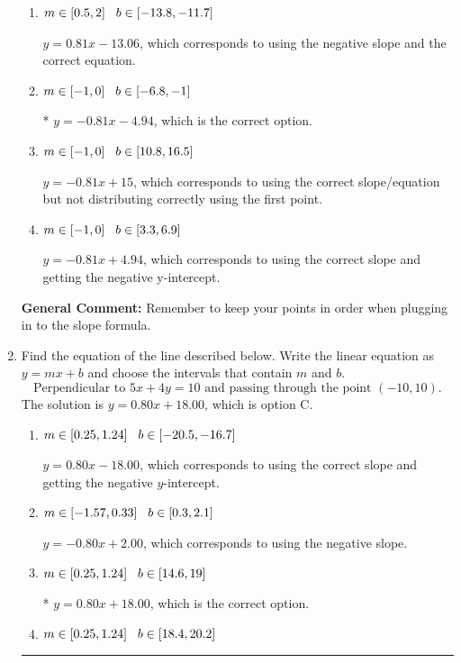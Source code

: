 \documentclass{extbook}[14pt]
\newcommand{\litem}[1]{\item #1

\rule{\textwidth}{0.4pt}}
\begin{document}
\begin{enumerate}
{\begin{enumerate}[label=\Alph*.]
 $y = -0.81x -14$, which corresponds to using the correct slope/equation but not distributing correctly using the second point.
\item \( m \in [0.5, 2] \hspace*{3mm} b \in [-13.8, -11.7] \)

 $y = 0.81x -13.06$, which corresponds to using the negative slope and the correct equation.
\item \( m \in [-1, 0] \hspace*{3mm} b \in [-6.8, -1] \)

* $y = -0.81x -4.94$, which is the correct option.
\item \( m \in [-1, 0] \hspace*{3mm} b \in [10.8, 16.5] \)

 $y = -0.81x + 15$, which corresponds to using the correct slope/equation but not distributing correctly using the first point.
\item \( m \in [-1, 0] \hspace*{3mm} b \in [3.3, 6.9] \)

 $y = -0.81x + 4.94$, which corresponds to using the correct slope and getting the negative y-intercept.
\end{enumerate}

\textbf{General Comment:} Remember to keep your points in order when plugging in to the slope formula.
}
\litem{
Find the equation of the line described below. Write the linear equation as $ y=mx+b $ and choose the intervals that contain $m$ and $b$.
\[ \text{Perpendicular to } 5 x + 4 y = 10 \text{ and passing through the point } (-10, 10). \]The solution is \( y = 0.80x + 18.00 \), which is option C.\begin{enumerate}[label=\Alph*.]
\item \( m \in [0.25, 1.24] \hspace*{3mm} b \in [-20.5, -16.7] \)

 $y = 0.80x - 18.00$, which corresponds to using the correct slope and getting the negative $y$-intercept.
\item \( m \in [-1.57, 0.33] \hspace*{3mm} b \in [0.3, 2.1] \)

 $y = -0.80x + 2.00$, which corresponds to using the negative slope.
\item \( m \in [0.25, 1.24] \hspace*{3mm} b \in [14.6, 19] \)

* $y = 0.80x + 18.00$, which is the correct option.
\item \( m \in [0.25, 1.24] \hspace*{3mm} b \in [18.4, 20.2] \)


\end{enumerate}}
\end{enumerate}
\end{document}
